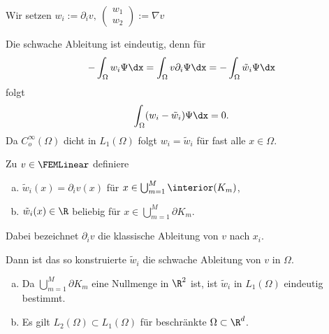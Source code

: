 \begin{Bezeichnung}
    Wir setzen
    $w_i := \partial_i v, \
    \left(\begin{smallmatrix}
            w_1 \\
            w_2
    \end{smallmatrix}\right) := \nabla v$
\end{Bezeichnung}


\begin{Bemerkung}
    Die schwache Ableitung ist eindeutig, denn für
    \begin{eqnarray*}
          -\int_\Omega w_i \Psi \dx = \int_\Omega v \partial_i \Psi \dx
        = - \int_\Omega \tilde w_i \Psi \dx
    \end{eqnarray*}
    folgt
    \begin{eqnarray*}
        \int_\Omega (w_i - \tilde w_i) \Psi \dx = 0.
    \end{eqnarray*}
    Da $C_o^\infty(\Omega)$ dicht in $L_1(\Omega)$ folgt $w_i = \tilde w_i$
    für fast alle $x \in \Omega$.
\end{Bemerkung}


\begin{Satz}
    \label{satz:3.6}
    Zu $v \in \FEMLinear$ definiere 
    \begin{enumerate}[a)]
        \item $\tilde{w}_i(x) = \partial_i v(x)$ für $x \in \bigcup_{m=1}^M \interior(K_m)$,
        \item $\tilde{w}_i(x) \in \R$ beliebig für $x \in \bigcup_{m=1}^M \partial K_m$.
    \end{enumerate}
    Dabei bezeichnet $\partial_i v$ die klassische Ableitung von $v$ nach $x_i$.
    
    Dann ist das so konstruierte $\tilde{w}_i$ die schwache Ableitung von $v$ in $\Omega$.
\end{Satz}


\begin{Bemerkung}
    \begin{enumerate}[a)]
        \item Da $\bigcup_{m=1}^M \partial K_m$ eine Nullmenge in $\R^2$ ist,
                ist $\tilde{w}_i$ in $L_1(\Omega)$ eindeutig bestimmt.
        \item Es gilt $L_2(\Omega) \subset L_1(\Omega)$ für beschränkte $\Omega \subset \R^d$.
    \end{enumerate}
\end{Bemerkung}


